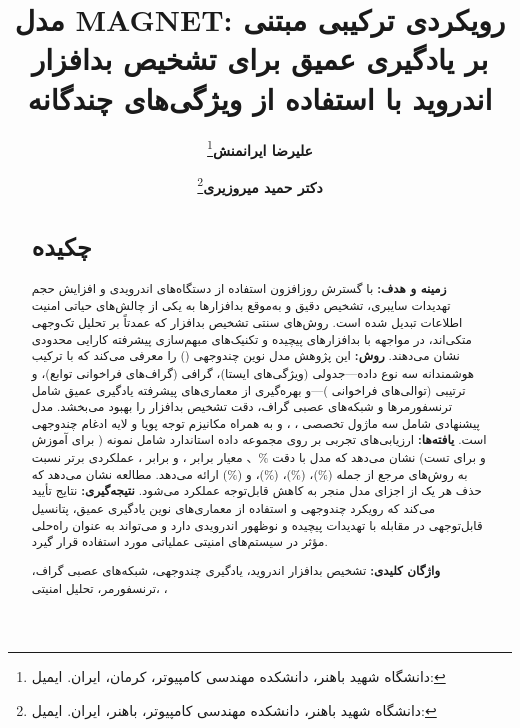 \documentclass[a4paper,11pt]{article}
\begin{document}
\title{\Large\textbf{مدل MAGNET: رویکردی ترکیبی مبتنی بر یادگیری عمیق برای تشخیص بدافزار اندروید با استفاده از ویژگی‌های چندگانه}}
\author{
  \textbf{علیرضا ایرانمنش}\thanks{دانشگاه شهید باهنر، دانشکده مهندسی کامپیوتر، کرمان، ایران. ایمیل: } \and
  \textbf{دکتر حمید میروزیری}\thanks{دانشگاه شهید باهنر، دانشکده مهندسی کامپیوتر، باهنر، ایران. ایمیل: }
}
\maketitle
\vspace{-1em}

\begin{abstract}
  \section*{چکیده}
  \textbf{زمینه و هدف:} با گسترش روزافزون استفاده از دستگاه‌های اندرویدی و افزایش حجم تهدیدات سایبری، تشخیص دقیق و به‌موقع بدافزارها به یکی از چالش‌های حیاتی امنیت اطلاعات تبدیل شده است. روش‌های سنتی تشخیص بدافزار که عمدتاً بر تحلیل تک‌وجهی متکی‌اند، در مواجهه با بدافزارهای پیچیده و تکنیک‌های مبهم‌سازی پیشرفته کارایی محدودی نشان می‌دهند. \textbf{روش:} این پژوهش مدل نوین چندوجهی  () را معرفی می‌کند که با ترکیب هوشمندانه سه نوع داده—جدولی (ویژگی‌های ایستا)، گرافی (گراف‌های فراخوانی توابع)، و ترتیبی (توالی‌های فراخوانی )—و بهره‌گیری از معماری‌های پیشرفته یادگیری عمیق شامل ترنسفورمرها و شبکه‌های عصبی گراف، دقت تشخیص بدافزار را بهبود می‌بخشد. مدل پیشنهادی شامل سه ماژول تخصصی ، ، و  به همراه مکانیزم توجه پویا و لایه ادغام چندوجهی است. \textbf{یافته‌ها:} ارزیابی‌های تجربی بر روی مجموعه داده استاندارد  شامل  نمونه ( برای آموزش و  برای تست) نشان می‌دهد که مدل  با دقت \%、 معیار  برابر ، و  برابر ، عملکردی برتر نسبت به روش‌های مرجع از جمله  (\%)،  (\%)،  (\%)، و  (\%) ارائه می‌دهد. مطالعه  نشان می‌دهد که حذف هر یک از اجزای مدل منجر به کاهش قابل‌توجه عملکرد می‌شود. \textbf{نتیجه‌گیری:} نتایج تأیید می‌کند که رویکرد چندوجهی و استفاده از معماری‌های نوین یادگیری عمیق، پتانسیل قابل‌توجهی در مقابله با تهدیدات پیچیده و نوظهور اندرویدی دارد و می‌تواند به عنوان راه‌حلی مؤثر در سیستم‌های امنیتی عملیاتی مورد استفاده قرار گیرد.

  \textbf{واژگان کلیدی:} تشخیص بدافزار اندروید، یادگیری چندوجهی، شبکه‌های عصبی گراف، ترنسفورمر، تحلیل امنیتی، ، 
\end{abstract}
\end{document}
